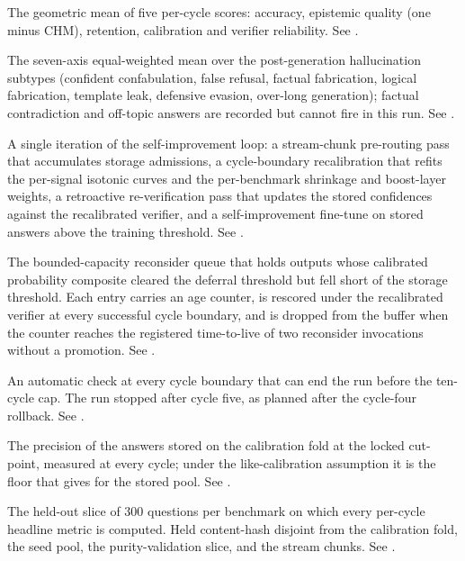 \begin{description}[style=nextline, leftmargin=0pt, labelindent=0pt, itemsep=6pt, parsep=0pt, font=\bfseries, beginpenalty=10000]
\item[Composite evaluation score (CES):] The geometric mean of five per-cycle scores: accuracy, epistemic quality (one minus CHM), retention, calibration and verifier reliability. See .

\item[Composite hallucination metric (CHM):]\nopagebreak[4] The seven-axis equal-weighted mean over the post-generation hallucination subtypes (confident confabulation, false refusal, factual fabrication, logical fabrication, template leak, defensive evasion, over-long generation); factual contradiction and off-topic answers are recorded but cannot fire in this run. See .

\item[Cycle:]\nopagebreak[4] A single iteration of the self-improvement loop: a stream-chunk pre-routing pass that accumulates storage admissions, a cycle-boundary recalibration that refits the per-signal isotonic curves and the per-benchmark shrinkage and boost-layer weights, a retroactive re-verification pass that updates the stored confidences against the recalibrated verifier, and a self-improvement fine-tune on stored answers above the training threshold. See .

\item[Deferred buffer:] The bounded-capacity reconsider queue that holds outputs whose calibrated probability composite cleared the deferral threshold but fell short of the storage threshold. Each entry carries an age counter, is rescored under the recalibrated verifier at every successful cycle boundary, and is dropped from the buffer when the counter reaches the registered time-to-live of two reconsider invocations without a promotion. See .

\item[Early-stop check:] An automatic check at every cycle boundary that can end the run before the ten-cycle cap. The run stopped after cycle five, as planned after the cycle-four rollback. See .

\item[Empirical-precision anchor:] The precision of the answers stored on the calibration fold at the locked cut-point, measured at every cycle; under the like-calibration assumption it is the floor that  gives for the stored pool. See .

\item[Evaluation fold:] The held-out slice of $300$ questions per benchmark on which every per-cycle headline metric is computed. Held content-hash disjoint from the calibration fold, the seed pool, the purity-validation slice, and the stream chunks. See .


\end{description}
